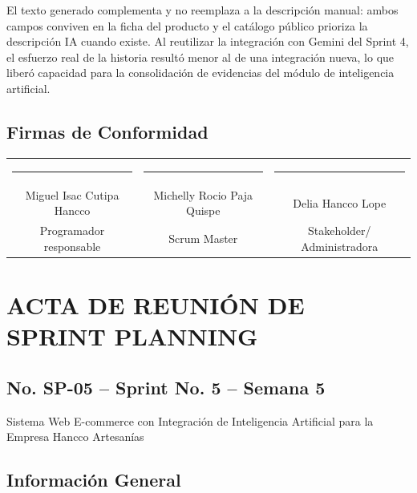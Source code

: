 \documentclass[12pt,a4paper]{article}
\renewcommand{\arraystretch}{1.25}
\begin{document}
El texto generado complementa y no reemplaza a la descripción manual: ambos campos conviven en la ficha del producto y el catálogo público prioriza la descripción IA cuando existe. Al reutilizar la integración con Gemini del Sprint 4, el esfuerzo real de la historia resultó menor al de una integración nueva, lo que liberó capacidad para la consolidación de evidencias del módulo de inteligencia artificial.

\subsection*{Firmas de Conformidad}

\begin{center}
\renewcommand{\arraystretch}{2}
\begin{tabular}{ccc}
\rule{4.5cm}{0.4pt} & \rule{4.5cm}{0.4pt} & \rule{4.5cm}{0.4pt} \\
Miguel Isac Cutipa Hancco & Michelly Rocio Paja Quispe & Delia Hancco Lope \\
Programador responsable & Scrum Master & Stakeholder/ Administradora
\end{tabular}
\end{center}

\clearpage

\section*{ACTA DE REUNIÓN DE SPRINT PLANNING}

\subsection*{No. SP-05 -- Sprint No. 5 -- Semana 5}

\begin{center}
Sistema Web E-commerce con Integración de Inteligencia Artificial para la Empresa Hancco Artesanías
\end{center}

\subsection*{Información General}
\end{document}
